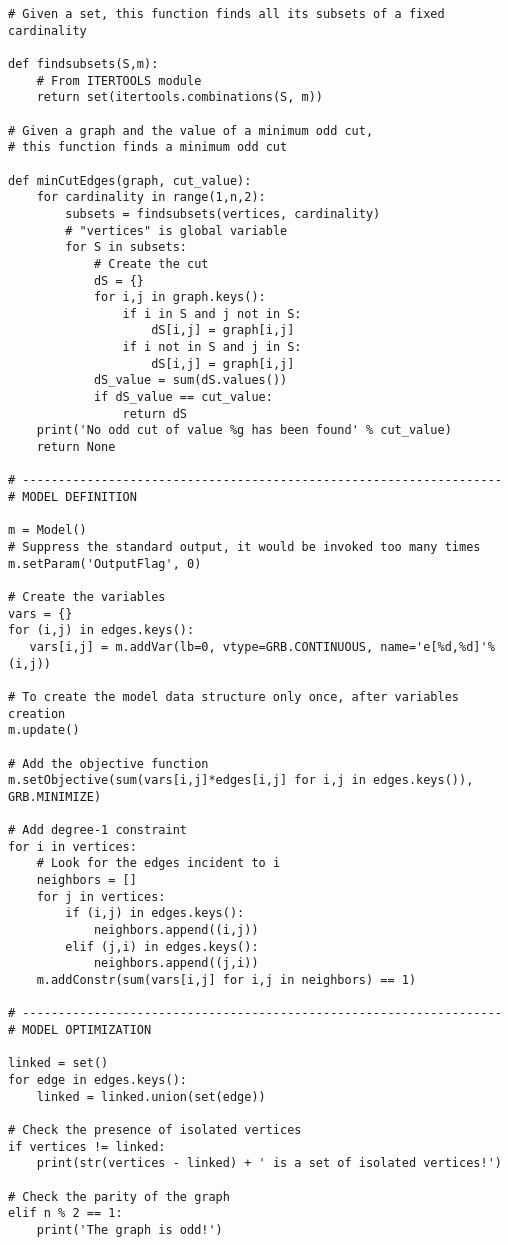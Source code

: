 \begin{verbatim}
# Given a set, this function finds all its subsets of a fixed cardinality

def findsubsets(S,m):
    # From ITERTOOLS module
    return set(itertools.combinations(S, m))

# Given a graph and the value of a minimum odd cut, 
# this function finds a minimum odd cut

def minCutEdges(graph, cut_value):
    for cardinality in range(1,n,2):
        subsets = findsubsets(vertices, cardinality) 
        # "vertices" is global variable
        for S in subsets:
            # Create the cut
            dS = {}
            for i,j in graph.keys():
                if i in S and j not in S:
                    dS[i,j] = graph[i,j]
                if i not in S and j in S:
                    dS[i,j] = graph[i,j]
            dS_value = sum(dS.values())
            if dS_value == cut_value:
                return dS
    print('No odd cut of value %g has been found' % cut_value)
    return None

# -------------------------------------------------------------------
# MODEL DEFINITION

m = Model()
# Suppress the standard output, it would be invoked too many times
m.setParam('OutputFlag', 0)

# Create the variables
vars = {}
for (i,j) in edges.keys():
   vars[i,j] = m.addVar(lb=0, vtype=GRB.CONTINUOUS, name='e[%d,%d]'%(i,j))

# To create the model data structure only once, after variables creation
m.update()

# Add the objective function
m.setObjective(sum(vars[i,j]*edges[i,j] for i,j in edges.keys()), GRB.MINIMIZE)

# Add degree-1 constraint
for i in vertices:
    # Look for the edges incident to i
    neighbors = []
    for j in vertices:
        if (i,j) in edges.keys():
            neighbors.append((i,j))
        elif (j,i) in edges.keys():
            neighbors.append((j,i))
    m.addConstr(sum(vars[i,j] for i,j in neighbors) == 1)

# -------------------------------------------------------------------
# MODEL OPTIMIZATION

linked = set()
for edge in edges.keys():
    linked = linked.union(set(edge))

# Check the presence of isolated vertices
if vertices != linked:
    print(str(vertices - linked) + ' is a set of isolated vertices!')

# Check the parity of the graph
elif n % 2 == 1:
    print('The graph is odd!')


\end{verbatim}
